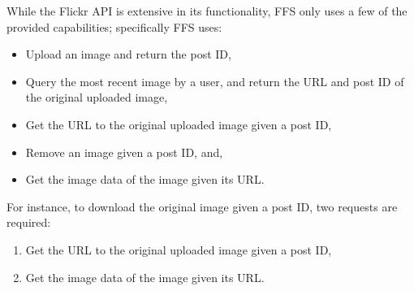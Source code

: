 While the Flickr \gls{API} is extensive in its functionality, \gls{FFS} only uses a few of the provided capabilities; specifically \gls{FFS} uses:
\begin{itemize}
	\item Upload an image and return the post ID,
	\item Query the most recent image by a user, and return the URL and post ID of the original uploaded image,
	\item Get the URL to the original uploaded image given a post ID,
	\item Remove an image given a post ID, and,
	\item Get the image data of the image given its URL.
\end{itemize}

For instance, to download the original image given a post ID, two requests are required:
\begin{enumerate}
	\item Get the URL to the original uploaded image given a post ID,
	\item Get the image data of the image given its URL.
\end{enumerate}

